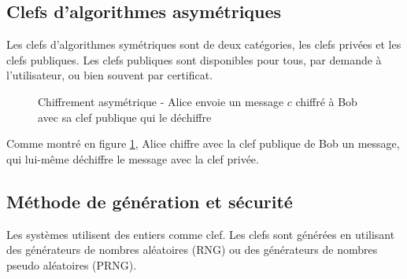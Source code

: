 \subsection{Clefs d'algorithmes asymétriques}

Les clefs d'algorithmes symétriques sont de deux catégories, les clefs privées et les clefs publiques. Les clefs publiques sont disponibles pour tous, par demande à l'utilisateur, ou bien souvent par certificat. 

\begin{figure}[H]
\begin{center}
\end{center}
\caption[Chiffrement asymétrique]{Chiffrement asymétrique - Alice envoie un message $c$ chiffré à Bob avec sa clef publique qui le déchiffre}
\label{asym}
\end{figure}

Comme montré en figure \ref{asym}, Alice chiffre avec la clef publique de Bob un message, qui lui-même déchiffre le message avec la clef privée.

\subsection{Méthode de génération et sécurité}


Les systèmes utilisent des entiers comme clef. Les clefs sont générées en utilisant des générateurs de nombres aléatoires (RNG) ou des générateurs de nombres pseudo aléatoires (PRNG). 

